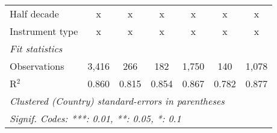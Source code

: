 \begin{table}[htbp]
\begin{tabular}{lcccccc}
      Half decade                                                      & x             & x                         & x              & x               & x               & x\\  
      Instrument type                                                  & x             & x                         & x              & x               & x               & x\\  
      \midrule \emph{Fit statistics}\\
      Observations                                                     & 3,416         & 266                       & 182            & 1,750           & 140             & 1,078\\  
      R$^2$                                                            & 0.860         & 0.815                     & 0.854          & 0.867           & 0.782           & 0.877\\  
      \midrule
      \multicolumn{7}{l}{\emph{Clustered (Country) standard-errors in parentheses}}\\
      \multicolumn{7}{l}{\emph{Signif. Codes: ***: 0.01, **: 0.05, *: 0.1}}\\
   \end{tabular}
\end{table}


